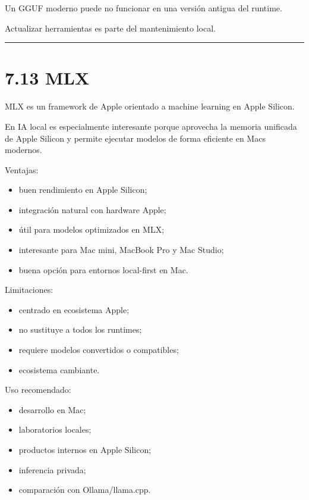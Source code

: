 Un GGUF moderno puede no funcionar en una versión antigua del runtime.

Actualizar herramientas es parte del mantenimiento local.

\begin{center}\rule{0.5\linewidth}{0.5pt}\end{center}

\section{7.13 MLX}\label{mlx}

MLX es un framework de Apple orientado a machine learning en Apple
Silicon.

En IA local es especialmente interesante porque aprovecha la memoria
unificada de Apple Silicon y permite ejecutar modelos de forma eficiente
en Macs modernos.

Ventajas:

\begin{itemize}
\tightlist
\item
  buen rendimiento en Apple Silicon;
\item
  integración natural con hardware Apple;
\item
  útil para modelos optimizados en MLX;
\item
  interesante para Mac mini, MacBook Pro y Mac Studio;
\item
  buena opción para entornos local-first en Mac.
\end{itemize}

Limitaciones:

\begin{itemize}
\tightlist
\item
  centrado en ecosistema Apple;
\item
  no sustituye a todos los runtimes;
\item
  requiere modelos convertidos o compatibles;
\item
  ecosistema cambiante.
\end{itemize}

Uso recomendado:

\begin{itemize}
\tightlist
\item
  desarrollo en Mac;
\item
  laboratorios locales;
\item
  productos internos en Apple Silicon;
\item
  inferencia privada;
\item
  comparación con Ollama/llama.cpp.
\end{itemize}


